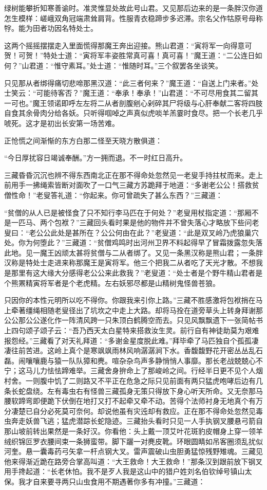 \documentclass[12pt,UTF8]{ctexbook}
\begin{document}
{绿树能攀折知寒善谕时。准灵惟显处故此号山君。又见那后边来的是一条胖汉你道怎生模样：嵯峨双角冠端肃耸肩背。性服青衣稳蹄步多迟滞。宗名父作牯原号母称牸。能为田者功因名特处士。

这两个摇摇摆摆走入里面慌得那魔王奔出迎接。熊山君道：“寅将军一向得意可贺！可贺！”特处士道：“寅将军丰姿胜常真可喜！真可喜！”魔王道：“二公连日如何？”山君道：“惟守素耳。”处士道：“惟随时耳。”三个叙罢各坐谈笑。

只见那从者绑得痛切悲啼那黑汉道：“此三者何来？”魔王道：“自送上门来者。”处士笑云：“可能待客否？”魔王道：“奉承！奉承！”山君道：“不可尽用食其二留其一可也。”魔王领诺即呼左左将二从者剖腹剜心剁碎其尸将级与心肝奉献二客将四肢自食其余骨肉分给各妖。只听得啯啅之声真似虎啖羊羔霎时食尽。把一个长老几乎唬死。这才是初出长安第一场苦难。

正怆慌之间渐惭的东方白那二怪至天晓方散俱道：

“今日厚扰容日竭诚奉酬。”方一拥而退。不一时红日高升。

三藏昏昏沉沉也辨不得东西南北正在那不得命处忽然见一老叟手持拄杖而来。走上前用手一拂绳索皆断对面吹了一口气三藏方苏跪拜于地道：“多谢老公公！搭救贫僧性命！”老叟答礼道：“你起来。你可曾疏失了甚么东西？”三藏道：

“贫僧的从人已是被怪食了只不知行李马匹在于何处？”老叟用杖指定道：“那厢不是一匹马、两个包袱？”三藏回头看时果是他的物件并不曾失落心才略放下些问老叟曰：“老公公此处是甚所在？公公何由在此？”老叟道：“此是双叉岭乃虎狼巢穴处。你为何堕此？”三藏道：“贫僧鸡鸣时出河州卫界不料起得早了冒霜拨露忽失落此地。见一魔王凶顽太甚将贫僧与二从者绑了。又见一条黑汉称是熊山君；一条胖汉称是特处士走进来称那魔王是寅将军。他三个把我二从者吃了天光才散。不想我是那里有这大缘大分感得老公公来此救我？”老叟道：“处士者是个野牛精山君者是个熊罴精寅将军者是个老虎精。左右妖邪尽都是山精树鬼怪兽苍狼。

只因你的本性元明所以吃不得你。你跟我来引你上路。”三藏不胜感激将包袱捎在马上牵著缰绳相随老叟径出了坑坎之中走上大路。却将马拴在道旁草头上转身拜谢那公公那公公遂化作一阵清风跨一只朱顶白鹤腾空而去。只见风飘飘遗下一张简帖书上四句颂子颂子云：“吾乃西天太白星特来搭救汝生灵。前行自有神徒助莫为艰难报怨经。”三藏看了对天礼拜道：“多谢金星度脱此难。”拜毕牵了马匹独自个孤孤凄凄往前苦进。这岭上真个是寒飒飒雨林风响潺潺涧下水。香馥馥野花开密丛丛乱石磊。闹嚷嚷鹿与猿一队队獐和麂。喧杂杂鸟声多静悄悄人事靡。那长老战兢兢心不宁；这马儿力怯怯蹄难举。三藏舍身拚命上了那峻岭之间。行经半日更不见个人烟村舍。一则腹中饥了二则路又不平正在危急之际只见前面有两只猛虎咆哮后边有几条长蛇盘绕。左有毒虫右有怪兽三藏孤身无策只得放下身心听天所命。又无奈那马腰软蹄弯即便跪下伏倒在地打又打不起牵又牵不动。苦得个法师衬身无地真个有万分凄楚已自分必死莫可奈何。却说他虽有灾迍却有救应。正在那不得命处忽然见毒虫奔走妖兽飞逃；猛虎潜踪长蛇隐迹。三藏抬头看时只见一人手执钢叉腰悬弓箭自那山坡前转出果然是一条好汉。你看他：头上戴一顶艾叶花斑豹皮帽身上穿一领羊绒织锦叵罗衣腰间束一条狮蛮带。脚下躧一对麂皮靴。环眼圆睛如吊客圈须乱扰似河奎。悬一囊毒药弓矢拿一杆点钢大叉。雷声震破山虫胆勇猛惊残野雉魂。三藏见他来得渐近跪在路旁合掌高叫道：“大王救命！大王救命！”那条汉到跟前放下钢叉用手搀起道：“长老休怕。我不是歹人我是这山中的猎户姓刘名伯钦绰号镇山太保。我才自来要寻两只山虫食用不期遇著你多有冲撞。”三藏道：

}
\end{document}
